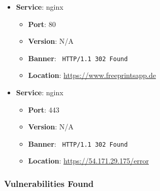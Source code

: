 \documentclass{article}
\begin{document}
\begin{itemize}
    
        \item \textbf{Service}: nginx
        \begin{itemize}
            \item \textbf{Port}: 80
            \item \textbf{Version}:  N/A 
            \item \textbf{Banner}: \texttt{ HTTP/1.1 302 Found
 }
            \item \textbf{Location}: \href{ https://www.freeprintsapp.de }{ https://www.freeprintsapp.de }
        \end{itemize}
    
        \item \textbf{Service}: nginx
        \begin{itemize}
            \item \textbf{Port}: 443
            \item \textbf{Version}:  N/A 
            \item \textbf{Banner}: \texttt{ HTTP/1.1 302 Found
 }
            \item \textbf{Location}: \href{ https://54.171.29.175/error }{ https://54.171.29.175/error }
        \end{itemize}
    
\end{itemize}


\subsubsection*{Vulnerabilities Found}
\end{document}
